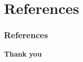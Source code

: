\documentclass[10pt]{beamer}
\begin{document}
\nocite{karoubi2008k}
\nocite{quillenhigherktheoryI}
\nocite{quillen1967homotopical}
\nocite{Goerss_Jardine_2009}	
\section{References}
\begin{frame}[allowframebreaks]
        \frametitle{References}
        
        
    \tiny{}
\end{frame}
\begin{frame}
    \textbf{\Huge{Thank you}}
\end{frame}
\end{document}
